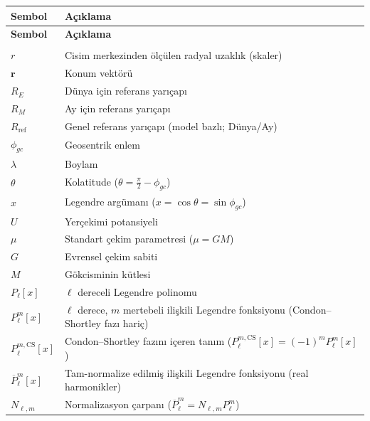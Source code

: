 \begin{longtable}{>{\raggedright\arraybackslash}p{3.2cm} p{10.8cm}}
\toprule
\textbf{Sembol} & \textbf{Açıklama} \\
\midrule
\endfirsthead

\toprule
\textbf{Sembol} & \textbf{Açıklama} \\
\midrule
\endhead

\midrule
\multicolumn{2}{r}{\emph{(devam ediyor)}}\\
\endfoot

\bottomrule
\endlastfoot

$r$ & Cisim merkezinden ölçülen radyal uzaklık (skaler) \\
$\mathbf{r}$ & Konum vektörü \\

$R_E$ & Dünya için referans yarıçapı \\
$R_M$ & Ay için referans yarıçapı \\
$R_{\text{ref}}$ & Genel referans yarıçapı (model bazlı; Dünya/Ay) \\

$\phi_{gc}$ & Geosentrik enlem \\
$\lambda$ & Boylam \\
$\theta$ & Kolatitude ($\theta=\tfrac{\pi}{2}-\phi_{gc}$) \\
$x$ & Legendre argümanı ($x=\cos\theta=\sin\phi_{gc}$) \\

$U$ & Yerçekimi potansiyeli \\
$\mu$ & Standart çekim parametresi ($\mu = GM$) \\
$G$ & Evrensel çekim sabiti \\
$M$ & Gökcisminin kütlesi \\

$P_{\ell}[x]$ & $\ell$ dereceli Legendre polinomu \\
$P_{\ell}^{m}[x]$ &
$\ell$ derece, $m$ mertebeli ilişkili Legendre fonksiyonu (Condon--Shortley fazı hariç) \\
$P_{\ell}^{m,\mathrm{CS}}[x]$ &
Condon--Shortley fazını içeren tanım ($P_{\ell}^{m,\mathrm{CS}}[x]=(-1)^m P_{\ell}^{m}[x]$) \\

$\overline{P}_{\ell}^{m}[x]$ &
Tam-normalize edilmiş ilişkili Legendre fonksiyonu (real harmonikler) \\
$N_{\ell,m}$ & Normalizasyon çarpanı ($\overline{P}_{\ell}^{m}=N_{\ell,m}P_{\ell}^{m}$) \\


\end{longtable}
